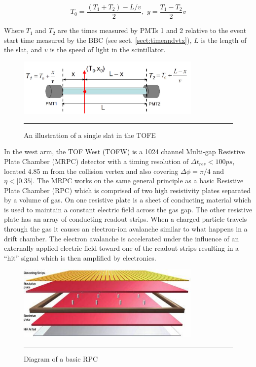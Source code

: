 \begin{equation}
T_{0} = \frac{(T_{1}+T_{2})-L/v}{2} , \, \, y = \frac{T_{1}-T_{2}}{2} v
\end{equation}

Where $T_1$ and $T_{2}$ are the times measured by PMTs 1 and 2 relative to the event start time measured by the BBC (see sect. \ref{sect:timeandvtx}), $L$ is the length of the slat, and $v$ is the speed of light in the scintillator.

\begin{figure}[htbp]
  \centering
    \includegraphics[width=0.8\textwidth]{Figures/TOFEcartoon.jpg}
    \rule{35em}{0.5pt}
  \caption[An illustration of a single slat in the TOFE]{An illustration of a single slat in the TOFE}
  \label{fig:TOFEcartoon}
\end{figure}

In the west arm, the TOF West (TOFW) is a 1024 channel Multi-gap Resistive Plate Chamber (MRPC) detector with a timing resolution of $\Delta t_{res} < 100 ps$, located 4.85 m from the collision vertex and also covering $\Delta\phi = \pi / 4$ and $\eta < |0.35|$. The MRPC works on the same general principle as a basic Resistive Plate Chamber (RPC) which is comprised of two high resistivity plates separated by a volume of gas. On one resistive plate is a sheet of conducting material which is used to maintain a constant electric field across the gas gap. The other resistive plate has an array of conducting readout strips. When a charged particle travels through the gas it causes an electron-ion avalanche similar to what happens in a drift chamber. The electron avalanche is accelerated under the influence of an externally applied electric field toward one of the readout strips resulting in a ``hit'' signal which is then amplified by electronics. 

\begin{figure}[h]
  \centering
    \includegraphics[width=0.8\textwidth]{Figures/RPClayers.jpg}
    \rule{35em}{0.5pt}
  \caption[Diagram of a basic RPC]{Diagram of a basic RPC \citep{CMSRPC}}
  \label{fig:RPCbasic}
\end{figure}

